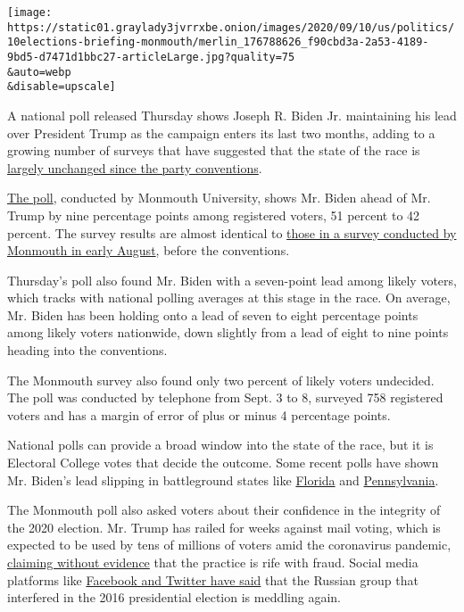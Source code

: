\texttt{[image: https://static01.graylady3jvrrxbe.onion/images/2020/09/10/us/politics/10elections-briefing-monmouth/merlin\_176788626\_f90cbd3a-2a53-4189-9bd5-d7471d1bbc27-articleLarge.jpg?quality=75\\\&auto=webp\\\&disable=upscale]}

A national poll released Thursday shows Joseph R. Biden Jr. maintaining
his lead over President Trump as the campaign enters its last two
months, adding to a growing number of surveys that have suggested that
the state of the race is
\href{https://www.nytimes3xbfgragh.onion/2020/09/03/us/elections/a-wave-of-polls-taken-after-the-conventions-show-little-change-in-bidens-lead.html}{largely
unchanged since the party conventions}.

\href{https://www.monmouth.edu/polling-institute/reports/monmouthpoll_US_091020/}{The
poll}, conducted by Monmouth University, shows Mr. Biden ahead of Mr.
Trump by nine percentage points among registered voters, 51 percent to
42 percent. The survey results are almost identical to
\href{https://www.monmouth.edu/polling-institute/reports/monmouthpoll_us_081120/}{those
in a survey conducted by Monmouth in early August}, before the
conventions.

Thursday's poll also found Mr. Biden with a seven-point lead among
likely voters, which tracks with national polling averages at this stage
in the race. On average, Mr. Biden has been holding onto a lead of seven
to eight percentage points among likely voters nationwide, down slightly
from a lead of eight to nine points heading into the conventions.

The Monmouth survey also found only two percent of likely voters
undecided. The poll was conducted by telephone from Sept. 3 to 8,
surveyed 758 registered voters and has a margin of error of plus or
minus 4 percentage points.

National polls can provide a broad window into the state of the race,
but it is Electoral College votes that decide the outcome. Some recent
polls have shown Mr. Biden's lead slipping in battleground states like
\href{https://www.documentcloud.org/documents/7203771-NBC-News-Marist-Poll-FL-Annotated-Questionnaire.html}{Florida}
and
\href{https://www.monmouth.edu/polling-institute/reports/monmouthpoll_pa_090220/}{Pennsylvania}.

The Monmouth poll also asked voters about their confidence in the
integrity of the 2020 election. Mr. Trump has railed for weeks against
mail voting, which is expected to be used by tens of millions of voters
amid the coronavirus pandemic,
\href{https://www.nytimes3xbfgragh.onion/article/mail-in-voting-explained.html}{claiming
without evidence} that the practice is rife with fraud. Social media
platforms like
\href{https://www.nytimes3xbfgragh.onion/2020/09/01/technology/facebook-russia-disinformation-election.html}{Facebook
and Twitter have said} that the Russian group that interfered in the
2016 presidential election is meddling again.

